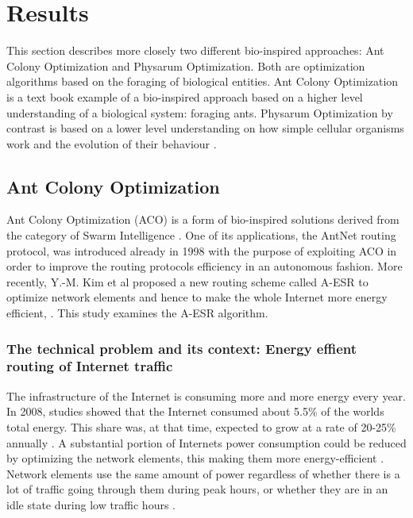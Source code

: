 \documentclass{IWORK2014}
\begin{document}
\section{Results}

This section describes more closely two different bio-inspired approaches: Ant Colony Optimization and Physarum Optimization. Both are optimization algorithms based on the foraging of biological entities. Ant Colony Optimization is a text book example of a bio-inspired approach based on a higher level understanding of a biological system: foraging ants. Physarum Optimization by contrast is based on a lower level understanding on how simple cellular organisms work and the evolution of their behaviour \cite{liu2012physarum}.

\subsection{Ant Colony Optimization}
Ant Colony Optimization (ACO) is a form of bio-inspired solutions derived from the category of Swarm Intelligence \cite{hylsberg2011bioinspired}. One of its applications, the AntNet routing protocol, was introduced already in 1998 \cite{di1998antnet} with the purpose of exploiting ACO in order to improve the routing protocols efficiency in an autonomous fashion. More recently, Y.-M. Kim et al \cite{kim2012ant} proposed a new routing scheme called A-ESR to optimize network elements and hence to make the whole Internet more energy efficient, \cite{kim2011ant}. This study examines the A-ESR algorithm.

\subsubsection{The technical problem and its context: Energy effient routing of Internet traffic}
The infrastructure of the Internet is consuming more and more energy every year. In 2008, studies showed that the Internet consumed about 5.5\% of the worlds total energy. This share was, at that time, expected to grow at a rate of 20-25\% annually \cite{proceedings2008energy}. A substantial portion of Internets power consumption could be reduced by optimizing the network elements, this making them more energy-efficient \cite{andrews2010routing}. Network elements use the same amount of power regardless of whether there is a lot of traffic going through them during peak hours, or whether they are in an idle state during low traffic hours \cite{gupta2007using}.
\end{document}
